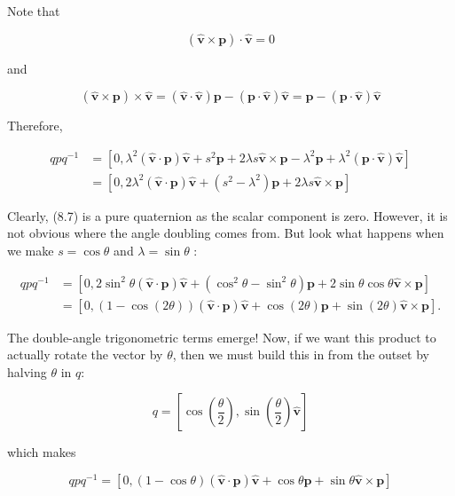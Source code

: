 \documentclass[10pt]{article}
\begin{document}
Note that

$$
(\hat{\mathbf{v}} \times \mathbf{p}) \cdot \hat{\mathbf{v}}=0
$$

and

$$
(\hat{\mathbf{v}} \times \mathbf{p}) \times \hat{\mathbf{v}}=(\hat{\mathbf{v}} \cdot \hat{\mathbf{v}}) \mathbf{p}-(\mathbf{p} \cdot \hat{\mathbf{v}}) \hat{\mathbf{v}}=\mathbf{p}-(\mathbf{p} \cdot \hat{\mathbf{v}}) \hat{\mathbf{v}}
$$

Therefore,

$$
\begin{aligned}
q p q^{-1} & =\left[0, \lambda^{2}(\hat{\mathbf{v}} \cdot \mathbf{p}) \hat{\mathbf{v}}+s^{2} \mathbf{p}+2 \lambda s \hat{\mathbf{v}} \times \mathbf{p}-\lambda^{2} \mathbf{p}+\lambda^{2}(\mathbf{p} \cdot \hat{\mathbf{v}}) \hat{\mathbf{v}}\right] \\
& =\left[0,2 \lambda^{2}(\hat{\mathbf{v}} \cdot \mathbf{p}) \hat{\mathbf{v}}+\left(s^{2}-\lambda^{2}\right) \mathbf{p}+2 \lambda s \hat{\mathbf{v}} \times \mathbf{p}\right]
\end{aligned}
$$

Clearly, (8.7) is a pure quaternion as the scalar component is zero. However, it is not obvious where the angle doubling comes from. But look what happens when we make $s=\cos \theta$ and $\lambda=\sin \theta$ :

$$
\begin{aligned}
q p q^{-1} & =\left[0,2 \sin ^{2} \theta(\hat{\mathbf{v}} \cdot \mathbf{p}) \hat{\mathbf{v}}+\left(\cos ^{2} \theta-\sin ^{2} \theta\right) \mathbf{p}+2 \sin \theta \cos \theta \hat{\mathbf{v}} \times \mathbf{p}\right] \\
& =[0,(1-\cos (2 \theta))(\hat{\mathbf{v}} \cdot \mathbf{p}) \hat{\mathbf{v}}+\cos (2 \theta) \mathbf{p}+\sin (2 \theta) \hat{\mathbf{v}} \times \mathbf{p}] .
\end{aligned}
$$

The double-angle trigonometric terms emerge! Now, if we want this product to actually rotate the vector by $\theta$, then we must build this in from the outset by halving $\theta$ in $q:$

$$
q=\left[\cos \left(\frac{\theta}{2}\right), \sin \left(\frac{\theta}{2}\right) \hat{\mathbf{v}}\right]
$$

which makes

$$
q p q^{-1}=[0,(1-\cos \theta)(\hat{\mathbf{v}} \cdot \mathbf{p}) \hat{\mathbf{v}}+\cos \theta \mathbf{p}+\sin \theta \hat{\mathbf{v}} \times \mathbf{p}]
$$
\end{document}
